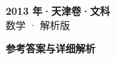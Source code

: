 \documentclass[zihao=-4, a4paper]{ctexart}
\begin{document}
\begin{center}
  {\Large\bfseries 2013 年·天津卷·文科}\\[4pt]
  {\large 数学 · 解析版}
\end{center}
\medskip
{}

\clearpage
{}
\begin{center}{\Large\bfseries 参考答案与详细解析}\end{center}
\medskip

\end{document}
